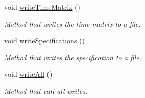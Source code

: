 \begin{DoxyCompactItemize}
void \hyperlink{class_v_r_p_t_w_instance_generator_ad421f66e920122f343388b7cc76df821}{writeTimeMatrix} ()
\begin{DoxyCompactList}\small\item\em Method that writes the time matrix to a file. \item\end{DoxyCompactList}\item 
void \hyperlink{class_v_r_p_t_w_instance_generator_a4e60794b765a408ae825d1793e0d7477}{writeSpecifications} ()
\begin{DoxyCompactList}\small\item\em Method that writes the specification to a file. \item\end{DoxyCompactList}\item 
void \hyperlink{class_v_r_p_t_w_instance_generator_a7549c70d0963392e4a1fea91fcd99780}{writeAll} ()
\begin{DoxyCompactList}\small\item\em Method that call all writes. \item\end{DoxyCompactList}\end{DoxyCompactItemize}

